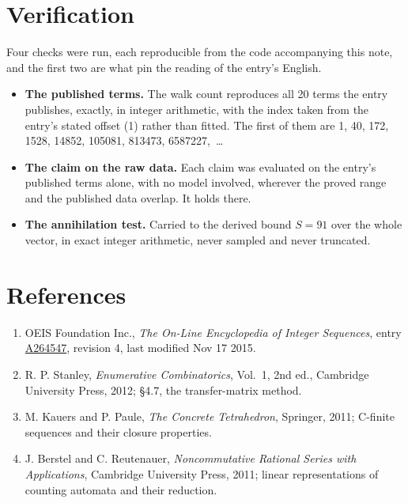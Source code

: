 \documentclass[11pt]{article}
\theoremstyle{definition}
\begin{document}
\section{Verification}

Four checks were run, each reproducible from the code accompanying this note, and the first two are what pin the reading of the entry's English.

\begin{itemize}

\item {\bfseries The published terms.} The walk count reproduces all 20 terms the entry publishes, exactly, in integer arithmetic, with the index taken from the entry's stated offset (1) rather than fitted. The first of them are 1, 40, 172, 1528, 14852, 105081, 813473, 6587227,~\dots

\item {\bfseries The claim on the raw data.} Each claim was evaluated on the entry's published terms alone, with no model involved, wherever the proved range and the published data overlap. It holds there.

\item {\bfseries The annihilation test.} Carried to the derived bound $S = 91$ over the whole vector, in exact integer arithmetic, never sampled and never truncated.

\end{itemize}

\section{References}

\begin{enumerate}

\item OEIS Foundation Inc., \emph{The On-Line Encyclopedia of Integer Sequences}, entry \href{https://oeis.org/A264547}{A264547}, revision 4, last modified Nov 17 2015.

\item R. P. Stanley, \emph{Enumerative Combinatorics}, Vol.~1, 2nd ed., Cambridge University Press, 2012; \S4.7, the transfer-matrix method.

\item M. Kauers and P. Paule, \emph{The Concrete Tetrahedron}, Springer, 2011; C-finite sequences and their closure properties.

\item J. Berstel and C. Reutenauer, \emph{Noncommutative Rational Series with Applications}, Cambridge University Press, 2011; linear representations of counting automata and their reduction.

\end{enumerate}
\end{document}
